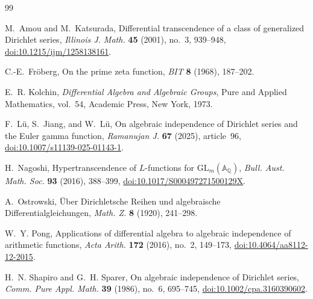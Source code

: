 \documentclass[11pt]{article}
\theoremstyle{definition}
\theoremstyle{remark}
\begin{document}
\begin{thebibliography}{99}
\small

M.~Amou and M.~Katsurada,
\newblock Differential transcendence of a class of generalized Dirichlet series,
\newblock \emph{Illinois J. Math.} \textbf{45} (2001), no.~3, 939--948,
\newblock \href{https://doi.org/10.1215/ijm/1258138161}{doi:10.1215/ijm/1258138161}.

C.-E.~Fr\"oberg,
\newblock On the prime zeta function,
\newblock \emph{BIT} \textbf{8} (1968), 187--202.

E.~R. Kolchin,
\newblock \emph{Differential Algebra and Algebraic Groups},
\newblock Pure and Applied Mathematics, vol.~54, Academic Press, New York, 1973.

F.~L\"u, S.~Jiang, and W.~L\"u,
\newblock On algebraic independence of Dirichlet series and the Euler gamma function,
\newblock \emph{Ramanujan J.} \textbf{67} (2025), article~96,
\newblock \href{https://doi.org/10.1007/s11139-025-01143-1}{doi:10.1007/s11139-025-01143-1}.

H.~Nagoshi,
\newblock Hypertranscendence of \(L\)-functions for
  \(\mathrm{GL}_m(\mathbb A_{\mathbb Q})\),
\newblock \emph{Bull. Aust. Math. Soc.} \textbf{93} (2016), 388--399,
\newblock \href{https://doi.org/10.1017/S000497271500129X}{doi:10.1017/S000497271500129X}.

A.~Ostrowski,
\newblock \"Uber Dirichletsche Reihen und algebraische Differentialgleichungen,
\newblock \emph{Math. Z.} \textbf{8} (1920), 241--298.

W.~Y. Pong,
\newblock Applications of differential algebra to algebraic independence of arithmetic
  functions,
\newblock \emph{Acta Arith.} \textbf{172} (2016), no.~2, 149--173,
\newblock \href{https://doi.org/10.4064/aa8112-12-2015}{doi:10.4064/aa8112-12-2015}.

H.~N. Shapiro and G.~H. Sparer,
\newblock On algebraic independence of Dirichlet series,
\newblock \emph{Comm. Pure Appl. Math.} \textbf{39} (1986), no.~6, 695--745,
\newblock \href{https://doi.org/10.1002/cpa.3160390602}{doi:10.1002/cpa.3160390602}.

\end{thebibliography}
\end{document}
